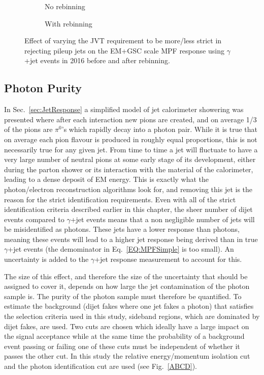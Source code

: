 \begin{figure}[!ht]
\centering
\begin{subfigure}{.5\textwidth}
\centering
{}
\caption{No rebinning}
\end{subfigure}%
\begin{subfigure}{.5\textwidth}  \centering
{}
\caption{With rebinning}
\end{subfigure}
\caption{Effect of varying the JVT requirement to be more/less strict in rejecting pileup jets on the EM+GSC scale MPF response using $\gamma$+jet events in 2016 before and after rebinning. }
\label{Fig:GJetJVTEM2016}
\end{figure}

\subsection{Photon Purity}
\label{Sec:purity}
In Sec.~\ref{sec:JetResponse} a simplified model of jet calorimeter showering was presented where after each interaction new pions are created, and on average 1/3 of the pions are $\pi^0$'s which rapidly decay into a photon pair.  
While it is true that on average each pion flavour is produced in roughly equal proportions, this is not necessarily true for any given jet.  
From time to time a jet will fluctuate to have a very large number of neutral pions at some early stage of its development, either during the parton shower or its interaction with the material of the calorimeter, leading to a dense deposit of EM energy.  
This is exactly what the photon/electron reconstruction algorithms look for, and removing this jet is the reason for the strict identification requirements.  
Even with all of the strict identification criteria described earlier in this chapter, the sheer number of dijet events compared to $\gamma$+jet events means that a non negligible number of jets will be misidentified as photons.  
These jets have a lower response than photons, meaning these events will lead to a higher jet response being derived than in true $\gamma$+jet events (the demominator in Eq.~\ref{EQ:MPFSimple} is too small).  
An uncertainty is added to the $\gamma$+jet response measurement to account for this.  

The size of this effect, and therefore the size of the uncertainty that should be assigned to cover it, depends on how large the jet contamination of the photon sample is.  
The purity of the photon sample must therefore be quantified.  
To estimate the background (dijet fakes where one jet fakes a photon) that  satisfies the selection criteria used in this study, sideband regions, which are dominated by dijet fakes, are used.  
Two cuts are chosen which ideally have a large impact on the signal acceptance while at the same time the probability of a background event passing or failing one of these cuts must be independent of whether it passes the other cut.  
In this study the relative energy/momentum isolation cut and the photon identification cut are used (see Fig.~\ref{ABCD}).  

